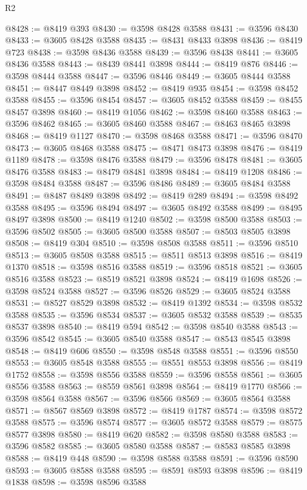 \begin{lexlean}{R2}
\begin{coremodule}
@8428 := @8419 @393
@8430 := @3598 @8428 @3588
@8431 := @3596 @8430
@8433 := @3605 @8428 @3588
@8435 := @8431 @8433 @3898
@8436 := @8419 @723
@8438 := @3598 @8436 @3588
@8439 := @3596 @8438
@8441 := @3605 @8436 @3588
@8443 := @8439 @8441 @3898
@8444 := @8419 @876
@8446 := @3598 @8444 @3588
@8447 := @3596 @8446
@8449 := @3605 @8444 @3588
@8451 := @8447 @8449 @3898
@8452 := @8419 @935
@8454 := @3598 @8452 @3588
@8455 := @3596 @8454
@8457 := @3605 @8452 @3588
@8459 := @8455 @8457 @3898
@8460 := @8419 @1056
@8462 := @3598 @8460 @3588
@8463 := @3596 @8462
@8465 := @3605 @8460 @3588
@8467 := @8463 @8465 @3898
@8468 := @8419 @1127
@8470 := @3598 @8468 @3588
@8471 := @3596 @8470
@8473 := @3605 @8468 @3588
@8475 := @8471 @8473 @3898
@8476 := @8419 @1189
@8478 := @3598 @8476 @3588
@8479 := @3596 @8478
@8481 := @3605 @8476 @3588
@8483 := @8479 @8481 @3898
@8484 := @8419 @1208
@8486 := @3598 @8484 @3588
@8487 := @3596 @8486
@8489 := @3605 @8484 @3588
@8491 := @8487 @8489 @3898
@8492 := @8419 @289
@8494 := @3598 @8492 @3588
@8495 := @3596 @8494
@8497 := @3605 @8492 @3588
@8499 := @8495 @8497 @3898
@8500 := @8419 @1240
@8502 := @3598 @8500 @3588
@8503 := @3596 @8502
@8505 := @3605 @8500 @3588
@8507 := @8503 @8505 @3898
@8508 := @8419 @304
@8510 := @3598 @8508 @3588
@8511 := @3596 @8510
@8513 := @3605 @8508 @3588
@8515 := @8511 @8513 @3898
@8516 := @8419 @1370
@8518 := @3598 @8516 @3588
@8519 := @3596 @8518
@8521 := @3605 @8516 @3588
@8523 := @8519 @8521 @3898
@8524 := @8419 @1698
@8526 := @3598 @8524 @3588
@8527 := @3596 @8526
@8529 := @3605 @8524 @3588
@8531 := @8527 @8529 @3898
@8532 := @8419 @1392
@8534 := @3598 @8532 @3588
@8535 := @3596 @8534
@8537 := @3605 @8532 @3588
@8539 := @8535 @8537 @3898
@8540 := @8419 @594
@8542 := @3598 @8540 @3588
@8543 := @3596 @8542
@8545 := @3605 @8540 @3588
@8547 := @8543 @8545 @3898
@8548 := @8419 @606
@8550 := @3598 @8548 @3588
@8551 := @3596 @8550
@8553 := @3605 @8548 @3588
@8555 := @8551 @8553 @3898
@8556 := @8419 @1752
@8558 := @3598 @8556 @3588
@8559 := @3596 @8558
@8561 := @3605 @8556 @3588
@8563 := @8559 @8561 @3898
@8564 := @8419 @1770
@8566 := @3598 @8564 @3588
@8567 := @3596 @8566
@8569 := @3605 @8564 @3588
@8571 := @8567 @8569 @3898
@8572 := @8419 @1787
@8574 := @3598 @8572 @3588
@8575 := @3596 @8574
@8577 := @3605 @8572 @3588
@8579 := @8575 @8577 @3898
@8580 := @8419 @620
@8582 := @3598 @8580 @3588
@8583 := @3596 @8582
@8585 := @3605 @8580 @3588
@8587 := @8583 @8585 @3898
@8588 := @8419 @448
@8590 := @3598 @8588 @3588
@8591 := @3596 @8590
@8593 := @3605 @8588 @3588
@8595 := @8591 @8593 @3898
@8596 := @8419 @1838
@8598 := @3598 @8596 @3588

\end{coremodule}
\end{lexlean}
